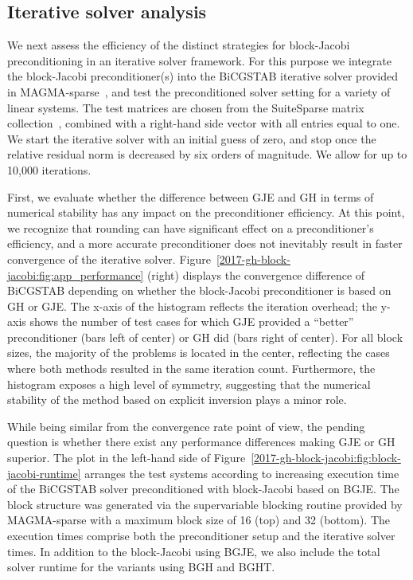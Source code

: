 \subsection{Iterative solver analysis}
We next assess the efficiency of the distinct strategies for block-Jacobi preconditioning in
an iterative solver framework. For this purpose we integrate 
the block-Jacobi preconditioner(s)
into the BiCGSTAB iterative solver provided
in MAGMA-sparse~\cite{ashes2016},
and test the preconditioned 
solver setting for a variety of linear systems. 
The test matrices are chosen from the SuiteSparse matrix collection~\cite{ufmc},
combined with a right-hand side vector with all entries equal to one. 
We start the iterative solver with an initial guess of zero,
and stop once the relative residual norm is decreased by six orders of magnitude.
We allow for up to 10,000 iterations. 

First, we evaluate whether the difference between GJE and GH in terms of numerical stability 
has any impact on the preconditioner efficiency. 
At this point, we recognize that rounding can have significant effect on
a preconditioner's efficiency,
and a more accurate preconditioner does not inevitably result in
faster convergence of the iterative solver. 
Figure~\ref{2017-gh-block-jacobi:fig:app_performance} (right)
displays the convergence difference
of BiCGSTAB depending on 
whether the block-Jacobi preconditioner is based 
on GH or GJE. 
The x-axis of the histogram reflects the iteration overhead;
the y-axis shows the number of test cases for which 
GJE provided a ``better'' preconditioner (bars left of center) or
GH did (bars right of center).
For all block sizes, the majority of the problems is located in the center,
reflecting the cases where both methods resulted in the same iteration count.
Furthermore, the histogram exposes a high level of symmetry,
suggesting that the numerical stability of the method based on explicit inversion plays a minor role.

While being similar from the convergence rate point of view, the pending question is
whether there exist any performance differences making GJE or GH superior.
The plot in the left-hand side of Figure~\ref{2017-gh-block-jacobi:fig:block-jacobi-runtime}
arranges the test systems according to increasing 
execution time of the BiCGSTAB solver preconditioned with block-Jacobi based on BGJE. 
The block structure was generated via the supervariable blocking routine
provided by MAGMA-sparse with a maximum block size of 16 (top) and 32 (bottom).
The execution times comprise both the preconditioner setup and the iterative solver times.
In addition to the block-Jacobi using BGJE, we also include the total solver runtime 
for the variants using BGH and BGHT.

